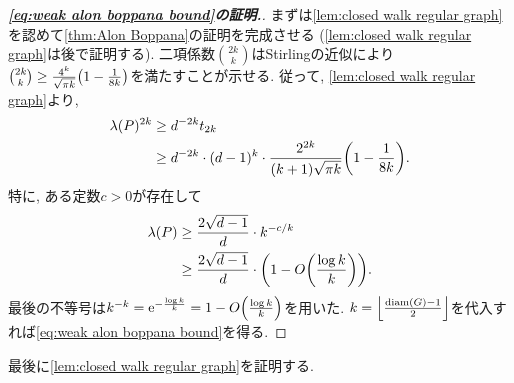 \begin{proof}[\textbf{\cref{eq:weak alon boppana bound}の証明.}]
    まずは\cref{lem:closed walk regular graph}を認めて\cref{thm:Alon Boppana}の証明を完成させる (\cref{lem:closed walk regular graph}は後で証明する).
    二項係数$\binom{2k}{k}$はStirlingの近似により$\binom{2k}{k} \ge \frac{4^k}{\sqrt{\pi k}}\rbra*{1-\frac{1}{8k}}$を満たすことが示せる.
    従って, \cref{lem:closed walk regular graph}より,
    \begin{align*}
        \lambda(P)^{2k} & \ge d^{-2k} t_{2k}                                                                     \\
                        & \ge d^{-2k}\cdot (d-1)^k \cdot \frac{2^{2k}}{(k+1)\sqrt{\pi k}}\rbra*{1-\frac{1}{8k}}.
    \end{align*}
    特に, ある定数$c>0$が存在して
    \begin{align*}
        \lambda(P) & \ge \frac{2\sqrt{d-1}}{d} \cdot k^{-c/k}                            \\
                   & \ge \frac{2\sqrt{d-1}}{d}\cdot \rbra*{1-O\rbra*{\frac{\log k}{k}}}.
    \end{align*}
    最後の不等号は$k^{-k}=\e^{-\frac{\log k}{k}} = 1-O\rbra*{\frac{\log k}{k}}$を用いた.
    $k=\floor*{\frac{\diam(G)-1}{2}}$を代入すれば\cref{eq:weak alon boppana bound}を得る.
\end{proof}
最後に\cref{lem:closed walk regular graph}を証明する.
